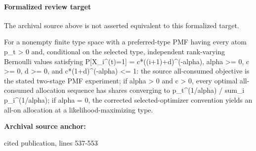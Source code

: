 \documentclass[10pt]{article}
\begin{document}
\paragraph{Formalized review target}
The archival source above is not asserted equivalent to this formalized target.
\begin{ReviewVerbatim}
For a nonempty finite type space with a preferred-type PMF having every atom p_t > 0 and, conditional on the selected type, independent rank-varying Bernoulli values satisfying P[X_i^(t)=1] = c*((i+1)+d)^(-alpha), alpha >= 0, c >= 0, d >= 0, and c*(1+d)^(-alpha) <= 1: the source all-consumed objective is the stated two-stage PMF experiment; if alpha > 0 and c > 0, every optimal all-consumed allocation sequence has shares converging to p_t^(1/alpha) / sum_i p_i^(1/alpha); if alpha = 0, the corrected selected-optimizer convention yields an all-on allocation at a likelihood-maximizing type.
\end{ReviewVerbatim}

\textbf{Archival source anchor:} {\footnotesize\raggedright cited publication, lines 537-\allowbreak{}553\par}
\end{document}
